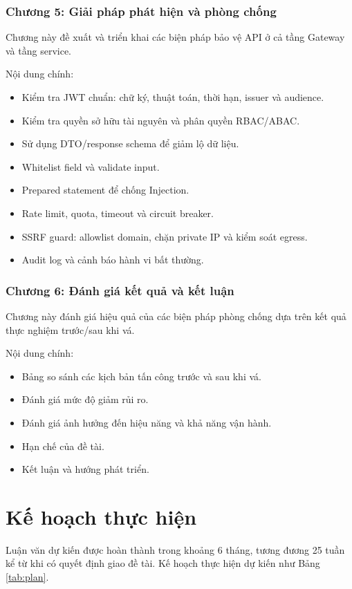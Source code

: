 \documentclass[14pt,a4paper]{extarticle}
\begin{document}
\subsubsection*{Chương 5: Giải pháp phát hiện và phòng chống}
Chương này đề xuất và triển khai các biện pháp bảo vệ API ở cả tầng Gateway và tầng service.

Nội dung chính:
\begin{itemize}
  \item Kiểm tra JWT chuẩn: chữ ký, thuật toán, thời hạn, issuer và audience.
  \item Kiểm tra quyền sở hữu tài nguyên và phân quyền RBAC/ABAC.
  \item Sử dụng DTO/response schema để giảm lộ dữ liệu.
  \item Whitelist field và validate input.
  \item Prepared statement để chống Injection.
  \item Rate limit, quota, timeout và circuit breaker.
  \item SSRF guard: allowlist domain, chặn private IP và kiểm soát egress.
  \item Audit log và cảnh báo hành vi bất thường.
\end{itemize}

\subsubsection*{Chương 6: Đánh giá kết quả và kết luận}
Chương này đánh giá hiệu quả của các biện pháp phòng chống dựa trên kết quả thực nghiệm trước/sau khi vá.

Nội dung chính:
\begin{itemize}
  \item Bảng so sánh các kịch bản tấn công trước và sau khi vá.
  \item Đánh giá mức độ giảm rủi ro.
  \item Đánh giá ảnh hưởng đến hiệu năng và khả năng vận hành.
  \item Hạn chế của đề tài.
  \item Kết luận và hướng phát triển.
\end{itemize}

\section{Kế hoạch thực hiện}

Luận văn dự kiến được hoàn thành trong khoảng 6 tháng, tương đương 25 tuần kể từ khi có quyết định giao đề tài. Kế hoạch thực hiện dự kiến như Bảng \ref{tab:plan}.
\end{document}
